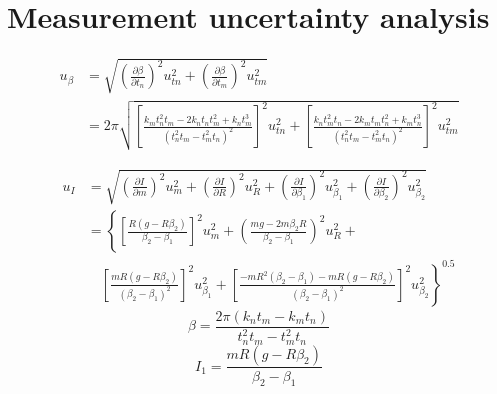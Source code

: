 \documentclass{article}
\begin{document}


\section{Measurement uncertainty analysis}

\begin{align*}
u_\beta&=\sqrt{
\left(\frac{\partial \beta}{\partial t_n}\right)^2u_{tn}^2+
\left(\frac{\partial \beta}{\partial t_m}\right)^2u_{tm}^2
}\\
&=2\pi\sqrt{
\left[\frac{k_mt_n^2t_m-2k_nt_nt_m^2+k_nt_m^3}{(t_n^2t_m-t_m^2t_n)^2}\right]^2u_{tn}^2+
\left[\frac{k_nt_m^2t_n-2k_mt_mt_n^2+k_mt_n^3}{(t_n^2t_m-t_m^2t_n)^2}\right]^2u_{tm}^2
}
\end{align*}

\begin{align*}
u_I&=\sqrt{
\left(\frac{\partial I}{\partial m}\right)^2u_{m}^2+
\left(\frac{\partial I}{\partial R}\right)^2u_{R}^2+
\left(\frac{\partial I}{\partial \beta_1}\right)^2u_{\beta_1}^2+
\left(\frac{\partial I}{\partial \beta_2}\right)^2u_{\beta_2}^2
}\\
&=\left\lbrace
\left[\frac{R(g-R\beta_2)}{\beta_2-\beta_1}\right]^2u_{m}^2+
\left(\frac{mg-2m\beta_2R}{\beta_2-\beta_1}\right)^2u_{R}^2+
\right.\\&\quad\left.
\left[\frac{mR(g-R\beta_2)}{(\beta_2-\beta_1)^2}\right]^2u_{\beta_1}^2+
\left[\frac{-mR^2(\beta_2-\beta_1)-mR(g-R\beta_2)}{(\beta_2-\beta_1)^2}\right]^2u_{\beta_2}^2
\right\rbrace^{0.5}
\end{align*}
$$\beta=\frac{2\pi(k_nt_m-k_mt_n)}{t_n^2t_m-t_m^2t_n}$$
$$I_1=\frac{mR(g-R\beta_2)}{\beta_2-\beta_1}$$
\end{document}
